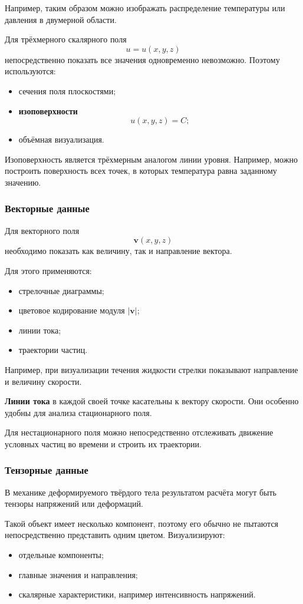 Например, таким образом можно изображать распределение температуры или давления в двумерной области.

Для трёхмерного скалярного поля
\[
u=u(x,y,z)
\]
непосредственно показать все значения одновременно невозможно. Поэтому используются:
\begin{itemize}
	\item сечения поля плоскостями;
	\item \textbf{изоповерхности}
	\[
	u(x,y,z)=C;
	\]
	\item объёмная визуализация.
\end{itemize}

Изоповерхность является трёхмерным аналогом линии уровня. Например, можно построить поверхность всех точек, в которых температура равна заданному значению.

\subsubsection*{Векторные данные}

Для векторного поля
\[
\mathbf{v}(x,y,z)
\]
необходимо показать как величину, так и направление вектора.

Для этого применяются:
\begin{itemize}
	\item стрелочные диаграммы;
	\item цветовое кодирование модуля $|\mathbf v|$;
	\item линии тока;
	\item траектории частиц.
\end{itemize}

Например, при визуализации течения жидкости стрелки показывают направление и величину скорости.

\textbf{Линии тока} в каждой своей точке касательны к вектору скорости. Они особенно удобны для анализа стационарного поля.

Для нестационарного поля можно непосредственно отслеживать движение условных частиц во времени и строить их траектории.

\subsubsection*{Тензорные данные}

В механике деформируемого твёрдого тела результатом расчёта могут быть тензоры напряжений или деформаций.

Такой объект имеет несколько компонент, поэтому его обычно не пытаются непосредственно представить одним цветом. Визуализируют:
\begin{itemize}
	\item отдельные компоненты;
	\item главные значения и направления;
	\item скалярные характеристики, например интенсивность напряжений.
\end{itemize}


